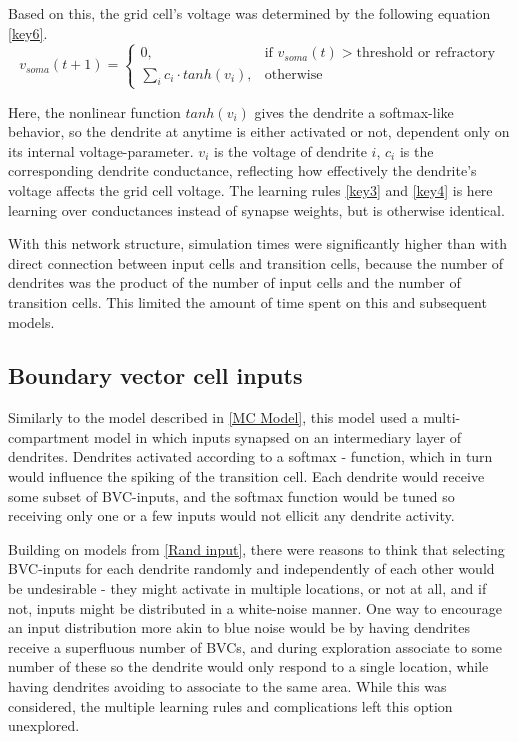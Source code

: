 \documentclass{article}
\begin{document}
    Based on this, the grid cell's voltage was determined by the following equation \ref{key6}. 
        \begin{equation}\label{key6} v_{soma}(t + 1) = \begin{cases} 0, & \text{if } v_{soma}(t) > \text{threshold or refractory}\\
        \sum_{i}^{} c_i \cdot tanh(v_i), & \text{otherwise} \end{cases}\end{equation} 
        
    Here, the nonlinear function \(tanh(v_i)\) gives the dendrite a softmax-like behavior, so the dendrite at anytime is either activated or not, dependent only on its internal voltage-parameter. \(v_i\) is the voltage of dendrite \(i\), \(c_i\) is the corresponding dendrite conductance, reflecting how effectively the dendrite's voltage affects the grid cell voltage. The learning rules \ref*{key3} and \ref*{key4} is here learning over conductances instead of synapse weights, but is otherwise identical.

    With this network structure, simulation times were significantly higher than with direct connection between input cells and transition cells, because the number of dendrites was the product of the number of input cells and the number of transition cells. This limited the amount of time spent on this and subsequent models.

    \subsection{Boundary vector cell inputs} \label{BVC Model}
    Similarly to the model described in \ref{MC Model}, this model used a multi-compartment model in which inputs synapsed on an intermediary layer of dendrites. Dendrites activated according to a softmax - function, which in turn would influence the spiking of the transition cell. Each dendrite would receive some subset of BVC-inputs, and the softmax function would be tuned so receiving only one or a few inputs would not ellicit any dendrite activity.

    Building on models from \ref{Rand input}, there were reasons to think that selecting BVC-inputs for each dendrite randomly and independently of each other would be undesirable - they might activate in multiple locations, or not at all, and if not, inputs might be distributed in a white-noise manner. One way to encourage an input distribution more akin to blue noise would be by having dendrites receive a superfluous number of BVCs, and during exploration associate to some number of these so the dendrite would only respond to a single location, while having dendrites avoiding to associate to the same area. While this was considered, the multiple learning rules and complications left this option unexplored.
    
\end{document}
